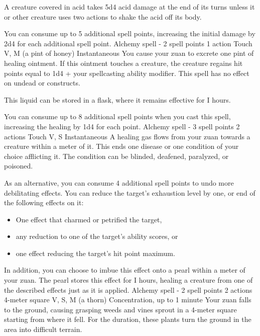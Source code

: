         A creature covered in acid takes 5d4 acid damage at the end of its turns unless it or other creature uses two actions to shake the acid off its body.

        You can consume up to 5 additional spell points, increasing the initial damage by 2d4 for each additional spell point.
        {Alchemy spell - 2 spell points}
        {1 action}
        {Touch}
        {V, M (a pint of honey)}
        {Instantaneous}
        You cause your zuan to excrete one pint of healing ointment.
        If this ointment touches a creature, the creature regains hit points equal to 1d4 + your spellcasting ability modifier.
        This spell has no effect on undead or constructs.

        This liquid can be stored in a flask, where it remains effective for I hours.

        You can consume up to 8 additional spell points when you cast this spell, increasing the healing by 1d4 for each point.
        {Alchemy spell - 3 spell points}
        {2 actions}
        {Touch}
        {V, S}
        {Instantaneous}
        A healing gas flows from your zuan towards a creature within a meter of it.
        This ends one disease or one condition of your choice afflicting it.
        The condition can be blinded, deafened, paralyzed, or poisoned.

        As an alternative, you can consume 4 additional spell points to undo more debilitating effects.
        You can reduce the target's exhaustion level by one, or end of the following effects on it:
        \begin{itemize}
            \item One effect that charmed or petrified the target,
            \item any reduction to one of the target's ability scores, or
            \item one effect reducing the target's hit point maximum.
        \end{itemize}

        In addition, you can choose to imbue this effect onto a pearl within a meter of your zuan.
        The pearl stores this effect for I hours, healing a creature from one of the described effects just as it is applied.
        {Alchemy spell - 2 spell points}
        {2 actions}
        {4-meter square}
        {V, S, M (a thorn)}
        {Concentration, up to 1 minute}
        Your zuan falls to the ground, causing grasping weeds and vines sprout in a 4-meter square starting from where it fell.
        For the duration, these plants turn the ground in the area into difficult terrain.

